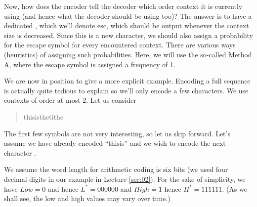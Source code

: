 \documentclass[a4paper, 11pt, openany]{book}
\begin{document}
Now, how does the encoder tell the decoder which order context it is currently using (and hence what the decoder should be using too)? The answer is to have a dedicated , which we'll denote esc, which should be output whenever the context size is decreased. Since this is a new character, we should also assign a probability for the escape symbol for every encountered context. There are various ways (heuristics) of assigning such probabilities. Here, we will use the so-called Method A, where the escape symbol is assigned a frequency of 1.


We are now in position to give a more explicit example. Encoding a full sequence is actually quite tedious to explain so we'll only encode a few characters. We use contexts of order at most 2. Let us consider
\begin{quote}
    this\textvisiblespace is\textvisiblespace the\textvisiblespace tithe
\end{quote}
The first few symbols are not very interesting, so let us skip forward. Let's assume we have already encoded ``this\textvisiblespace is'' and we wish to encode the next character \textvisiblespace.

We assume the word length for arithmetic coding is six bits (we used four decimal digits in our example in Lecture \ref{sec:02}). For the sake of simplicity, we have $Low = 0$ and hence $L^* = 000000$ and $High = 1$ hence $H^* = 111111$. (As we shall see, the low and high values may vary over time.)
\end{document}
